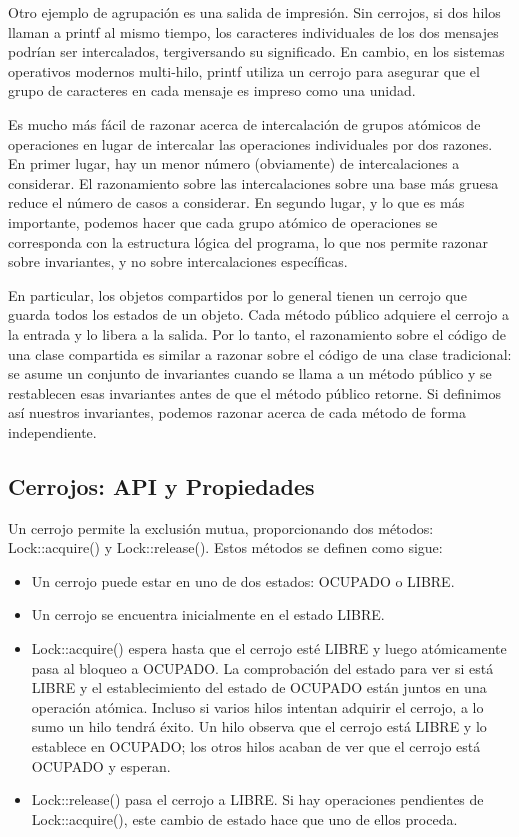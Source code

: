 \documentclass[10pt]{book}
\begin{document}
Otro ejemplo de agrupación es una salida de impresión. Sin cerrojos, si dos hilos llaman a {\mf printf} al mismo tiempo, los caracteres individuales de los dos mensajes podrían ser intercalados, tergiversando su significado. En cambio, en los sistemas operativos modernos multi-hilo, {\mf printf} utiliza un cerrojo para asegurar que el grupo de caracteres en cada mensaje es impreso como una unidad.

Es mucho más fácil de razonar acerca de intercalación de grupos atómicos de operaciones en lugar de intercalar las operaciones individuales por dos razones. En primer lugar, hay un menor número (obviamente) de intercalaciones a considerar. El razonamiento sobre las intercalaciones sobre una base más gruesa reduce el número de casos a considerar. En segundo lugar, y lo que es más importante, podemos hacer que cada grupo atómico de operaciones se corresponda con la estructura lógica del programa, lo que nos permite razonar sobre invariantes, y no sobre intercalaciones específicas.

En particular, los objetos compartidos por lo general tienen un cerrojo que guarda todos los estados de un objeto. Cada método público adquiere el cerrojo a la entrada y lo libera a la salida. Por lo tanto, el razonamiento sobre el código de una clase compartida es similar a razonar sobre el código de una clase tradicional: se asume un conjunto de invariantes cuando se llama a un método público y se restablecen esas invariantes antes de que el método público retorne. Si definimos así nuestros invariantes, podemos razonar acerca de cada método de forma independiente.

\subsection{Cerrojos: API y Propiedades}
Un cerrojo permite la exclusión mutua, proporcionando dos métodos: {\mf Lock::acquire()} y {\mf Lock::release()}. Estos métodos se definen como sigue:
\begin{itemize}
\item Un cerrojo puede estar en uno de dos estados: OCUPADO o LIBRE.
\item Un cerrojo se encuentra inicialmente en el estado LIBRE.
\item {\mf Lock::acquire()} espera hasta que el cerrojo esté LIBRE y luego atómicamente pasa al bloqueo a OCUPADO. La comprobación del estado para ver si está LIBRE y el establecimiento del estado de OCUPADO están juntos en una operación atómica. Incluso si varios hilos intentan adquirir el cerrojo, a lo sumo un hilo tendrá éxito. Un hilo observa que el cerrojo está LIBRE y lo establece en OCUPADO; los otros hilos acaban de ver que el cerrojo está OCUPADO y esperan.
\item {\mf Lock::release()} pasa el cerrojo a LIBRE. Si hay operaciones pendientes de {\mf Lock::acquire()}, este cambio de estado hace que uno de ellos proceda.
\end{itemize}
\end{document}
